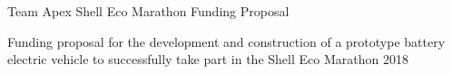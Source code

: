 \documentclass[a4paper, 12pt]{article}
\begin{document}
	\hypersetup{pageanchor=false}
	\begin{titlepage}
		{\LARGE \centerline{Team Apex Shell Eco Marathon Funding Proposal}\par}
		\vspace*{\fill}
		{\large\centering Funding proposal for the development and construction of a prototype battery electric vehicle to successfully take part in the Shell Eco Marathon 2018\par}
		\vspace*{\fill}
		\makebox[\textwidth][c]{\par\today}
	\end{titlepage}
\end{document}
